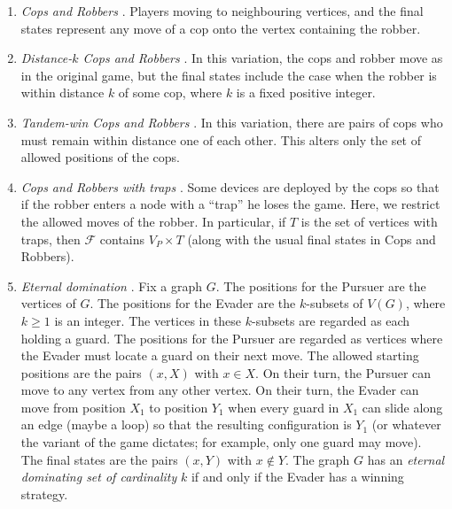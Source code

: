 \documentclass[12pt,reqno]{amsart}
\begin{document}
\begin{enumerate}
\item \emph{Cops and Robbers} \cite{AF,NW,Q1,Q2}. Players moving to neighbouring vertices, and the final states represent any move of a cop onto the vertex containing the robber.

\item \emph{Distance-$k$ Cops and Robbers} \cite{bcp,ccnv}. In this variation, the cops and robber move as in the original game, but the final states include the case when the robber is within
    distance $k$ of some cop, where $k$ is a fixed positive integer.

\item \emph{Tandem-win Cops and Robbers} \cite{CN1,C3}. In this variation, there are pairs of cops who must remain within distance one of each other. This alters only the set of allowed positions of the cops.

\item \emph{Cops and Robbers with traps} \cite{cn}. Some devices are deployed by the cops so that if the robber enters a node with a ``trap'' he loses the game. Here, we restrict the allowed moves
    of the robber. In particular, if $T$ is the set of vertices with traps, then $\mathcal{F}$ contains $V_P \times T$ (along with the usual final states in Cops and Robbers).

\item \emph{Eternal domination} \cite{ghh}. Fix a graph $G$. The positions for the Pursuer are the vertices of $G$.  The positions for the Evader are the $k$-subsets of $V(G)$, where $k\ge 1$ is an
    integer. The vertices in these $k$-subsets are regarded as each holding a guard. The positions for the Pursuer are regarded as vertices where the Evader must locate a guard on their next move.
    The allowed starting positions are the pairs $(x, X)$ with $x \in X.$  On their turn, the Pursuer can move to any vertex from any other vertex. On their turn, the Evader can move from position
    $X_1$ to position $Y_1$ when every guard in $X_1$ can slide along an edge (maybe a loop) so that the resulting configuration is $Y_1$ (or whatever the variant of the game dictates; for example,
    only one guard may move).  The final states are the pairs $(x, Y)$ with $x \not \in Y$.  The graph $G$ has an \emph{eternal dominating set of cardinality} $k$ if and only if the Evader has a
    winning strategy.


\end{enumerate}
\end{document}
